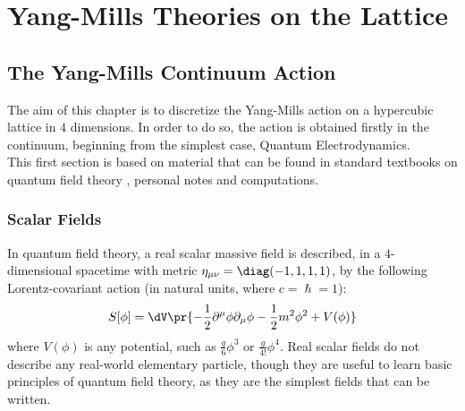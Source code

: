 \pagestyle{myFancy}
\chapter{Yang-Mills Theories on the Lattice}
\section{The Yang-Mills Continuum Action}
The aim of this chapter is to discretize the Yang-Mills action on a hypercubic lattice in $4$ dimensions. In order to do so, the action is obtained firstly in the continuum, beginning from the simplest case, Quantum Electrodynamics.\\
This first section is based on material that can be found in standard textbooks on quantum field theory \cite{srednicki2007quantum, peskin1995introduction, weinberg1995quantum, kaku1993quantum, ramond1997field}, personal notes and computations.

\subsection{Scalar Fields}
In quantum field theory, a real scalar massive field is described, in a $4$-dimensional spacetime with metric $\eta_{\mu\nu} = \diag(-1,1,1,1)$, by the following Lorentz-covariant action (in natural units, where $c = \hslash = 1$):
\begin{equation}
    S[\phi] = \dV \pr{-\frac12 \partial^\mu\phi\partial_\mu\phi -\frac12 m^2\phi^2 +V(\phi)} \label{1:ActionScalar}
\end{equation}
where $V(\phi)$ is any potential, such as $\frac{g}{6}\phi^3$ or $\frac{g}{4!}\phi^4$.
Real scalar fields do not describe any real-world elementary particle, though they are useful to learn basic principles of quantum field theory, as they are the simplest fields that can be written.

